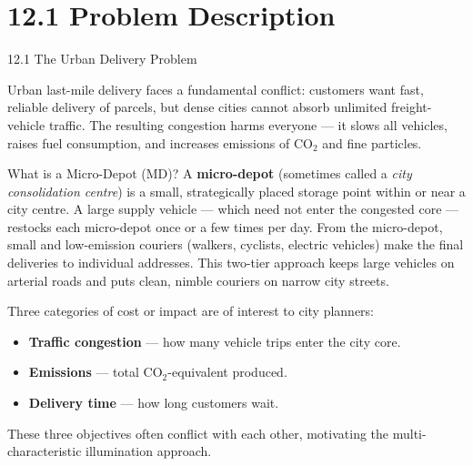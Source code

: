 \documentclass[aspectratio=169,10pt]{beamer}
\begin{document}
\section{12.1 Problem Description}

\begin{frame}[allowframebreaks]{12.1 The Urban Delivery Problem}

Urban last-mile delivery faces a fundamental conflict:
customers want fast, reliable delivery of parcels,
but dense cities cannot absorb unlimited freight-vehicle traffic.
The resulting congestion harms everyone --- it slows all vehicles,
raises fuel consumption, and increases emissions of \(\text{CO}_2\)
and fine particles.

\medskip

\begin{block}{What is a Micro-Depot (MD)?}
  A \textbf{micro-depot} (sometimes called a \emph{city consolidation centre})
  is a small, strategically placed storage point within or near a city centre.
  A large supply vehicle --- which need not enter the congested core ---
  restocks each micro-depot once or a few times per day.
  From the micro-depot, small and low-emission couriers (walkers, cyclists,
  electric vehicles) make the final deliveries to individual addresses.
  This two-tier approach keeps large vehicles on arterial roads
  and puts clean, nimble couriers on narrow city streets.
\end{block}

\medskip

Three categories of cost or impact are of interest to city planners:

\begin{itemize}
  \item \textbf{Traffic congestion} --- how many vehicle trips enter the city core.
  \item \textbf{Emissions} --- total \(\text{CO}_2\)-equivalent produced.
  \item \textbf{Delivery time} --- how long customers wait.
\end{itemize}

These three objectives often conflict with each other, motivating the
multi-characteristic illumination approach.

\end{frame}
\end{document}
